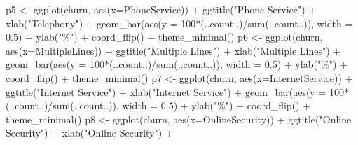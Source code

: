 \documentclass[
]{article}
\newenvironment{Shaded}{\begin{snugshade}}{\end{snugshade}}
\newcommand{\AttributeTok}[1]{\textcolor[rgb]{0.77,0.63,0.00}{#1}}
\newcommand{\DecValTok}[1]{\textcolor[rgb]{0.00,0.00,0.81}{#1}}
\newcommand{\FloatTok}[1]{\textcolor[rgb]{0.00,0.00,0.81}{#1}}
\newcommand{\FunctionTok}[1]{\textcolor[rgb]{0.00,0.00,0.00}{#1}}
\newcommand{\NormalTok}[1]{#1}
\newcommand{\OtherTok}[1]{\textcolor[rgb]{0.56,0.35,0.01}{#1}}
\newcommand{\SpecialCharTok}[1]{\textcolor[rgb]{0.00,0.00,0.00}{#1}}
\newcommand{\StringTok}[1]{\textcolor[rgb]{0.31,0.60,0.02}{#1}}
\begin{document}
\begin{Shaded}
\begin{Highlighting}[]
\NormalTok{p5 }\OtherTok{\textless{}{-}} \FunctionTok{ggplot}\NormalTok{(churn, }\FunctionTok{aes}\NormalTok{(}\AttributeTok{x=}\NormalTok{PhoneService)) }\SpecialCharTok{+} \FunctionTok{ggtitle}\NormalTok{(}\StringTok{"Phone Service"}\NormalTok{) }\SpecialCharTok{+} \FunctionTok{xlab}\NormalTok{(}\StringTok{"Telephony"}\NormalTok{) }\SpecialCharTok{+}
  \FunctionTok{geom\_bar}\NormalTok{(}\FunctionTok{aes}\NormalTok{(}\AttributeTok{y =} \DecValTok{100}\SpecialCharTok{*}\NormalTok{(..count..)}\SpecialCharTok{/}\FunctionTok{sum}\NormalTok{(..count..)), }\AttributeTok{width =} \FloatTok{0.5}\NormalTok{) }\SpecialCharTok{+} \FunctionTok{ylab}\NormalTok{(}\StringTok{"\%"}\NormalTok{) }\SpecialCharTok{+} \FunctionTok{coord\_flip}\NormalTok{() }\SpecialCharTok{+} \FunctionTok{theme\_minimal}\NormalTok{()}
\NormalTok{p6 }\OtherTok{\textless{}{-}} \FunctionTok{ggplot}\NormalTok{(churn, }\FunctionTok{aes}\NormalTok{(}\AttributeTok{x=}\NormalTok{MultipleLines)) }\SpecialCharTok{+} \FunctionTok{ggtitle}\NormalTok{(}\StringTok{"Multiple Lines"}\NormalTok{) }\SpecialCharTok{+} \FunctionTok{xlab}\NormalTok{(}\StringTok{"Multiple Lines"}\NormalTok{) }\SpecialCharTok{+} 
  \FunctionTok{geom\_bar}\NormalTok{(}\FunctionTok{aes}\NormalTok{(}\AttributeTok{y =} \DecValTok{100}\SpecialCharTok{*}\NormalTok{(..count..)}\SpecialCharTok{/}\FunctionTok{sum}\NormalTok{(..count..)), }\AttributeTok{width =} \FloatTok{0.5}\NormalTok{) }\SpecialCharTok{+} \FunctionTok{ylab}\NormalTok{(}\StringTok{"\%"}\NormalTok{) }\SpecialCharTok{+} \FunctionTok{coord\_flip}\NormalTok{() }\SpecialCharTok{+} \FunctionTok{theme\_minimal}\NormalTok{()}
\NormalTok{p7 }\OtherTok{\textless{}{-}} \FunctionTok{ggplot}\NormalTok{(churn, }\FunctionTok{aes}\NormalTok{(}\AttributeTok{x=}\NormalTok{InternetService)) }\SpecialCharTok{+} \FunctionTok{ggtitle}\NormalTok{(}\StringTok{"Internet Service"}\NormalTok{) }\SpecialCharTok{+} \FunctionTok{xlab}\NormalTok{(}\StringTok{"Internet Service"}\NormalTok{) }\SpecialCharTok{+} 
  \FunctionTok{geom\_bar}\NormalTok{(}\FunctionTok{aes}\NormalTok{(}\AttributeTok{y =} \DecValTok{100}\SpecialCharTok{*}\NormalTok{(..count..)}\SpecialCharTok{/}\FunctionTok{sum}\NormalTok{(..count..)), }\AttributeTok{width =} \FloatTok{0.5}\NormalTok{) }\SpecialCharTok{+} \FunctionTok{ylab}\NormalTok{(}\StringTok{"\%"}\NormalTok{) }\SpecialCharTok{+} \FunctionTok{coord\_flip}\NormalTok{() }\SpecialCharTok{+} \FunctionTok{theme\_minimal}\NormalTok{()}
\NormalTok{p8 }\OtherTok{\textless{}{-}} \FunctionTok{ggplot}\NormalTok{(churn, }\FunctionTok{aes}\NormalTok{(}\AttributeTok{x=}\NormalTok{OnlineSecurity)) }\SpecialCharTok{+} \FunctionTok{ggtitle}\NormalTok{(}\StringTok{"Online Security"}\NormalTok{) }\SpecialCharTok{+} \FunctionTok{xlab}\NormalTok{(}\StringTok{"Online Security"}\NormalTok{) }\SpecialCharTok{+}

\end{Highlighting}
\end{Shaded}
\end{document}

